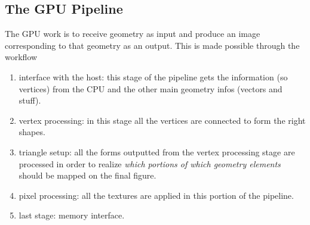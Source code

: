 \documentclass[10pt,a4paper]{article}
\begin{document}
			\subsection{The GPU Pipeline}
				The GPU work is to receive geometry as input and produce an image corresponding to that geometry as an output. This is made possible through the workflow
				\begin{enumerate}
					\item interface with the host: this stage of the pipeline gets the information (so vertices) from the CPU and the other main geometry infos (vectors and stuff).
					\item vertex processing: in this stage all the vertices are connected to form the right shapes. 
					\item triangle setup: all the forms outputted from the vertex processing stage are processed in order to realize \emph{which portions of which geometry elements} should be mapped on the final figure.
					\item pixel processing: all the textures are applied in this portion of the pipeline.
					\item last stage: memory interface. 
				\end{enumerate}
				
		
			
\end{document}

